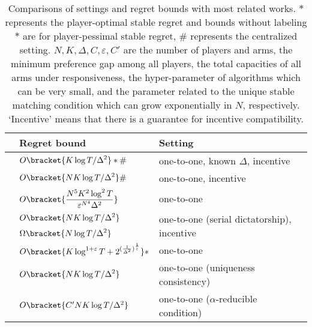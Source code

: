 \begin{table*}[htb!]
\centering
\caption{Comparisons of settings and regret bounds with most related works. $*$ represents the player-optimal stable regret and bounds without labeling $*$ are for player-pessimal stable regret, 
$\#$ represents the centralized setting.  
$N,K,\Delta,C, \varepsilon, C'$ are the number of players and arms, the minimum preference gap among all players, the total capacities of all arms under responsiveness, the hyper-parameter of algorithms which can be very small, and the parameter related to the unique stable matching condition which can grow exponentially in $N$, respectively. `Incentive' means that there is a guarantee for incentive compatibility. 
} 
\label{table:comparison}
\begin{tabular}{lll}
\toprule 
  & Regret bound       & Setting                     \\\hline
\rule{0pt}{13pt}\multirow{2}{*}{\citet{liu2020competing}} & $\displaystyle O\bracket{{K\log T/\Delta^2}} *\#$  & one-to-one, known $\Delta$, incentive\\
& $\displaystyle O\bracket{{NK\log T/\Delta^2}}\#$              & one-to-one, incentive \\\hline
\rule{0pt}{20pt}\citet{liu2021bandit}                                                                                 & $\displaystyle O\bracket{\frac{N^5K^2\log^2 T}{\varepsilon^{N^{4}}\Delta^2}}$                                                       & one-to-one                        \\ \hline
\rule{0pt}{12pt}\multirow{2}{*}{\citet{sankararaman2021dominate} }& $\displaystyle O\bracket{{NK\log T}/{\Delta^2}}$ & \multirow{2}{*}{one-to-one (serial dictatorship), incentive }   \\ &
              $\displaystyle\Omega\bracket{{N\log T}/{\Delta^2}}$                &                          \\\hline
\rule{0pt}{13pt}\multirow{2}{*}{\citet{basu21beyond}} & $\displaystyle O\bracket{K\log^{1+\varepsilon} T + 
2^{(\frac{1}{\Delta^2})^{\frac{1}{\varepsilon}}} } *$                 & one-to-one \\
                       &  $\displaystyle O\bracket{{NK\log T}/{\Delta^2}}$                &   one-to-one (uniqueness consistency)                                    \\\hline
\rule{0pt}{15pt}\citet{maheshwari2022decentralized}                                                                                 &   $O\bracket{C'NK\log T/\Delta^2}$                                                     & one-to-one ($\alpha$-reducible condition)                        \\ \hline

\end{tabular}
\end{table*}
